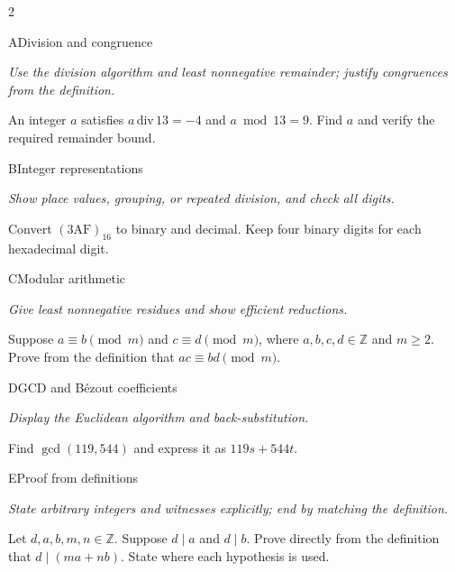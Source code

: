 \documentclass[9pt]{extarticle}
\begin{document}
\begin{multicols}{2}
\begin{CoreProblem}{A}{Division and congruence}
{\scriptsize\textit{Use the division algorithm and least nonnegative remainder; justify congruences from the definition.}\par}
An integer $a$ satisfies $a\,\mathrm{div}\,13=-4$ and $a\bmod13=9$.
Find $a$ and verify the required remainder bound.
\end{CoreProblem}
\begin{CoreProblem}{B}{Integer representations}
{\scriptsize\textit{Show place values, grouping, or repeated division, and check all digits.}\par}
Convert $(\mathrm{3AF})_{16}$ to binary and decimal. Keep four binary digits
for each hexadecimal digit.
\end{CoreProblem}
\begin{CoreProblem}{C}{Modular arithmetic}
{\scriptsize\textit{Give least nonnegative residues and show efficient reductions.}\par}
Suppose $a\equiv b\pmod m$ and $c\equiv d\pmod m$, where
$a,b,c,d\in\mathbb Z$ and $m\ge2$. Prove from the definition that
$ac\equiv bd\pmod m$.
\end{CoreProblem}
\columnbreak
\begin{CoreProblem}{D}{GCD and B\'ezout coefficients}
{\scriptsize\textit{Display the Euclidean algorithm and back-substitution.}\par}
Find $\gcd(119,544)$ and express it as $119s+544t$.
\end{CoreProblem}
\begin{CoreProblem}{E}{Proof from definitions}
{\scriptsize\textit{State arbitrary integers and witnesses explicitly; end by matching the definition.}\par}
Let $d,a,b,m,n\in\mathbb Z$. Suppose $d\mid a$ and $d\mid b$. Prove directly
from the definition that $d\mid(ma+nb)$. State where each hypothesis is used.
\end{CoreProblem}
\end{multicols}
\CoreWorkArea
\FormBreak
{}
\end{document}
